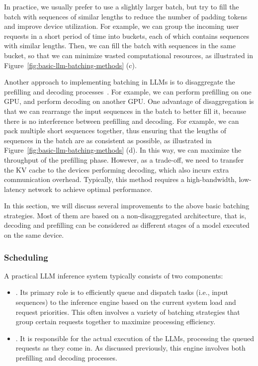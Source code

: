 In practice, we usually prefer to use a slightly larger batch, but try to fill the batch with sequences of similar lengths to reduce the number of padding tokens and improve device utilization. For example, we can group the incoming user requests in a short period of time into buckets, each of which contains sequences with similar lengths. Then, we can fill the batch with sequences in the same bucket, so that we can minimize wasted computational resources, as illustrated in Figure~\ref{fig:basic-llm-batching-methods} (c).

Another approach to implementing batching in LLMs is to disaggregate the prefilling and decoding processes~\cite{wu-etal:2023fast,patel-etal:2024splitwise,zhong-etal:2024distserve}. For example, we can perform prefilling on one GPU, and perform decoding on another GPU. One advantage of disaggregation is that we can rearrange the input sequences in the batch to better fill it, because there is no interference between prefilling and decoding. For example, we can pack multiple short sequences together, thus ensuring that the lengths of sequences in the batch are as consistent as possible, as illustrated in Figure~\ref{fig:basic-llm-batching-methods} (d). In this way, we can maximize the throughput of the prefilling phase. However, as a trade-off, we need to transfer the KV cache to the devices performing decoding, which also incurs extra communication overhead. Typically, this method requires a high-bandwidth, low-latency network to achieve optimal performance.

In this section, we will discuss several improvements to the above basic batching strategies. Most of them are based on a non-disaggregated architecture, that is, decoding and prefilling can be considered as different stages of a model executed on the same device.

\subsubsection{Scheduling}

A practical LLM inference system typically consists of two components:

\begin{itemize}
\item \vspace{0.5cm} . Its primary role is to efficiently queue and dispatch tasks (i.e., input sequences) to the inference engine based on the current system load and request priorities. This often involves a variety of batching strategies that group certain requests together to maximize processing efficiency.
\item \vspace{0.3cm} . It is responsible for the actual execution of the LLMs, processing the queued requests as they come in. As discussed previously, this engine involves both prefilling and decoding processes.
\end{itemize}
\vspace{0.5em}

